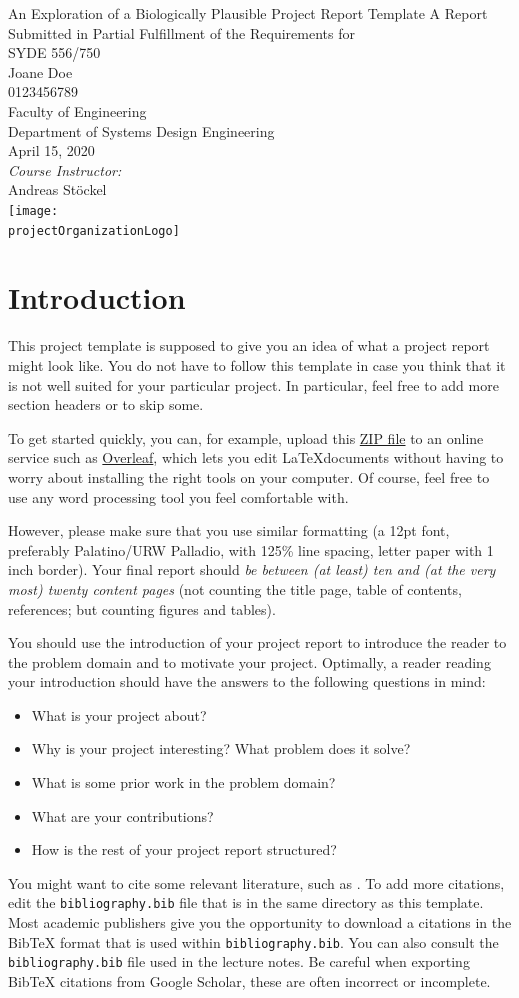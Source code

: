 \documentclass[12pt,letterpaper,oneside]{article}
\newcommand{\MakeTitle}{%
	{%
		\thispagestyle{empty}
		\centering
		{\huge \projectName}
		\vfill
		{\large A Report Submitted in Partial Fulfillment of the Requirements for\\ \projectCourse}\\[1cm]
		{\large \projectStudentName}\\
		{\projectStudentID} \\[1cm]
		{\large \projectStudentFaculty}\\
		{\large \projectStudentDepartment}\\
		\vfill
		{\large \projectDate}\\[1cm]
		\emph{Course Instructor:}\\
		\projectCourseInstructor\\
		\vfill
		\texttt{[image: \\projectOrganizationLogo]}
		\setcounter{page}{0}
		\newpage%
	}%
	{%
		\pagenumbering{roman}
		\setcounter{tocdepth}{2}
		\tableofcontents
		\newpage
		
		\setcounter{page}{0}
		\pagenumbering{arabic}
	}
}
\newcommand{\projectCourse}%
	{SYDE 556/750}
\newcommand{\projectCourseInstructor}%
	{Andreas Stöckel}
\newcommand{\projectOrganizationLogo}%
	{assets/uwlogo.pdf}
\newcommand{\projectName}%
	{An Exploration of a Biologically Plausible Project Report Template}
\newcommand{\projectStudentName}%
	{Joane Doe}
\newcommand{\projectStudentID}%
	{0123456789}
\newcommand{\projectStudentFaculty}%
	{Faculty of Engineering}
\newcommand{\projectStudentDepartment}%
	{Department of Systems Design Engineering}
\newcommand{\projectDate}%
	{April 15, 2020}
\begin{document}
	\MakeTitle

	\section{Introduction}
	\label{sec:introduction}

	This project template is supposed to give you an idea of what a project report might look like. You do not have to follow this template in case you think that it is not well suited for your particular project. In particular, feel free to add more section headers or to skip some.

	To get started quickly, you can, for example, upload this \href{https://github.com/astoeckel/syde556-w20/raw/master/project/template.zip}{ZIP file} to an online service such as \href{https://www.overleaf.com/}{Overleaf}, which lets you edit \LaTeX documents without having to worry about installing the right tools on your computer. Of course, feel free to use any word processing tool you feel comfortable with.

	However, please make sure that you use similar formatting (a 12pt font, preferably Palatino/URW Palladio, with 125\% line spacing, letter paper with 1 inch border). Your final report should \emph{be between (at least) ten and (at the very most) twenty content pages} (not counting the title page, table of contents, references; but counting figures and tables).

	You should use the introduction of your project report to introduce the reader to the problem domain and to motivate your project. Optimally, a reader reading your introduction should have the answers to the following questions in mind:
	\begin{itemize}
		\item What is your project about?
		\item Why is your project interesting? What problem does it solve?
		\item What is some prior work in the problem domain?
		\item What are your contributions?
		\item How is the rest of your project report structured?
	\end{itemize}

 	You might want to cite some relevant literature, such as \cite{eliasmith2003neural,eliasmith2013how}. To add more citations, edit the \texttt{bibliography.bib} file that is in the same directory as this template. Most academic publishers give you the opportunity to download a citations in the BibTeX format that is used within \texttt{bibliography.bib}. You can also consult the \texttt{bibliography.bib} file used in the lecture notes. Be careful when exporting BibTeX citations from Google Scholar, these are often incorrect or incomplete.
 	
\end{document}
